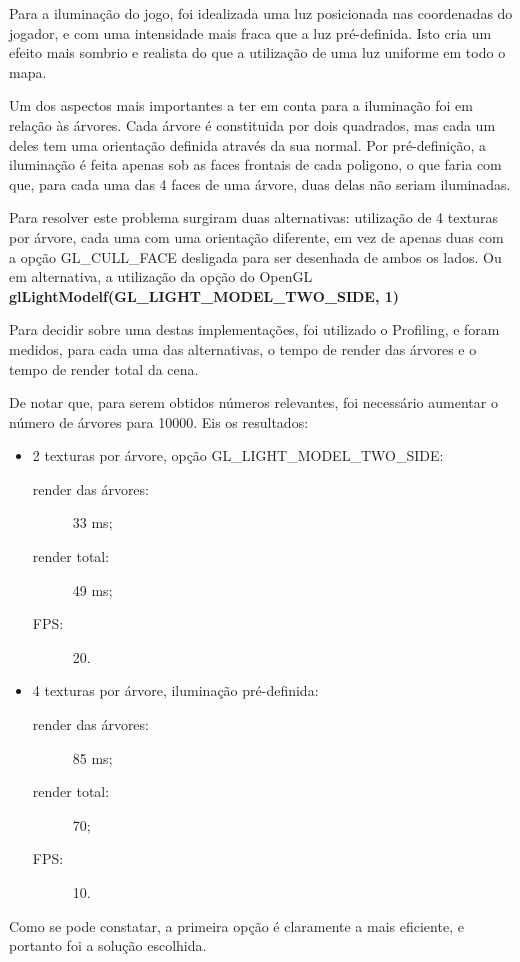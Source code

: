Para a iluminação do jogo, foi idealizada uma luz posicionada nas coordenadas do jogador, e com uma intensidade mais fraca que a luz pré-definida. Isto cria um efeito mais sombrio e realista do que a utilização de uma luz uniforme em todo o mapa.

Um dos aspectos mais importantes a ter em conta para a iluminação foi em relação às árvores. Cada árvore é constituida por dois quadrados, mas cada um deles tem uma orientação definida através da sua normal.
Por pré-definição, a iluminação é feita apenas sob as faces frontais de cada poligono, o que faria com que, para cada uma das 4 faces de uma árvore, duas delas não seriam iluminadas.

Para resolver este problema surgiram duas alternativas: utilização de 4 texturas por árvore, cada uma com uma orientação diferente, em vez de apenas duas com a opção GL\_CULL\_FACE desligada para ser desenhada de ambos os lados. Ou em alternativa, a utilização da opção do OpenGL \textbf{glLightModelf(GL\_LIGHT\_MODEL\_TWO\_SIDE, 1)}

Para decidir sobre uma destas implementações, foi utilizado o Profiling, e foram medidos, para cada uma das alternativas, o tempo de render das árvores e o tempo de render total da cena.

De notar que, para serem obtidos números relevantes, foi necessário aumentar o número de árvores para 10000.
Eis os resultados:
\begin{itemize}
\item 2 texturas por árvore, opção GL\_LIGHT\_MODEL\_TWO\_SIDE:
	\begin{description}
		\item[render das árvores:] 33 ms;
		\item[render total:]	49 ms;
		\item[FPS:] 20.
	\end{description}
\item 4 texturas por árvore, iluminação pré-definida:
	\begin{description}
		\item[render das árvores:] 85 ms;
		\item[render total:]	70;
		\item[FPS:] 10. 
	\end{description}
\end{itemize}

Como se pode constatar, a primeira opção é claramente a mais eficiente, e portanto foi a solução escolhida.
